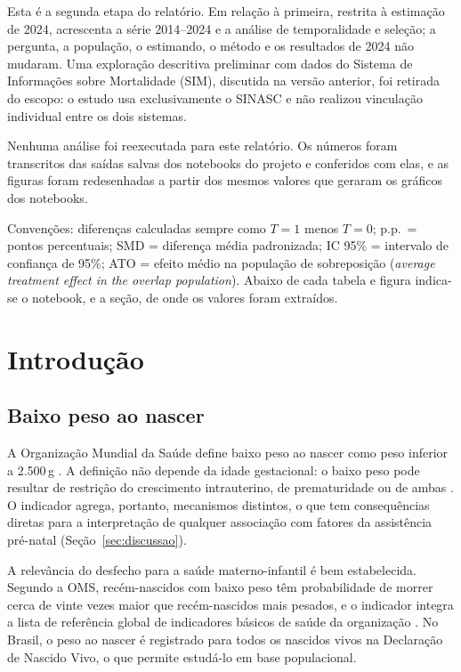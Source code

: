 \documentclass[11pt,a4paper]{article}
\begin{document}
Esta é a segunda etapa do relatório. Em relação à primeira, restrita à estimação de 2024,
acrescenta a série 2014--2024 e a análise de temporalidade e seleção; a pergunta, a
população, o estimando, o método e os resultados de 2024 não mudaram. Uma exploração
descritiva preliminar com dados do Sistema de Informações sobre Mortalidade (SIM),
discutida na versão anterior, foi retirada do escopo: o estudo usa exclusivamente o SINASC
e não realizou vinculação individual entre os dois sistemas.

Nenhuma análise foi reexecutada para este relatório. Os números foram transcritos das
saídas salvas dos notebooks do projeto e conferidos com elas, e as figuras foram
redesenhadas a partir dos mesmos valores que geraram os gráficos dos notebooks.

Convenções: diferenças calculadas sempre como $T=1$ menos $T=0$; p.p.\ = pontos
percentuais; SMD = diferença média padronizada; IC 95\% = intervalo de confiança de 95\%;
ATO = efeito médio na população de sobreposição (\emph{average treatment effect in the
overlap population}). Abaixo de cada tabela e figura indica-se o notebook, e a seção, de
onde os valores foram extraídos.

\section{Introdução}\label{sec:introducao}

\subsection{Baixo peso ao nascer}

A Organização Mundial da Saúde define baixo peso ao nascer como peso inferior a
2.500\,g \cite{who_lbw}. A definição não depende da idade gestacional: o baixo peso pode
resultar de restrição do crescimento intrauterino, de prematuridade ou de ambas
\cite{who_lbw}. O indicador agrega, portanto, mecanismos distintos, o que tem
consequências diretas para a interpretação de qualquer associação com fatores da
assistência pré-natal (Seção~\ref{sec:discussao}).

A relevância do desfecho para a saúde materno-infantil é bem estabelecida. Segundo a OMS,
recém-nascidos com baixo peso têm probabilidade de morrer cerca de vinte vezes maior que
recém-nascidos mais pesados, e o indicador integra a lista de referência global de
indicadores básicos de saúde da organização \cite{who_lbw}. No Brasil, o peso ao nascer é
registrado para todos os nascidos vivos na Declaração de Nascido Vivo, o que permite
estudá-lo em base populacional.
\end{document}
